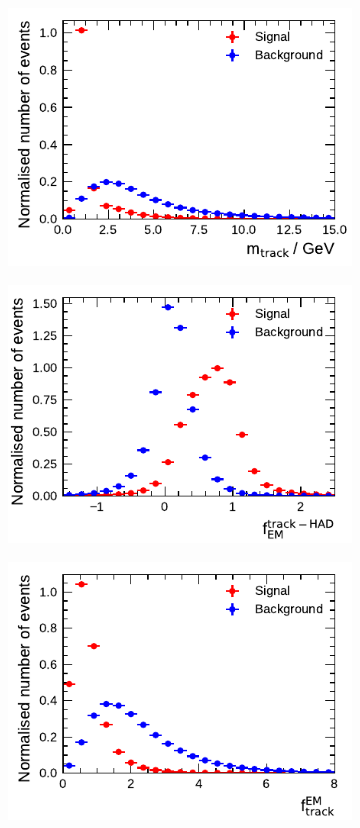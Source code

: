 \begin{figure}[htbp]\ContinuedFloat
  \begin{subfigure}{0.5\textwidth}
    \centering
    \includegraphics{./figures/baseline_bdt_vars/3p/massTrkSys.pdf}
  \end{subfigure}%
  \begin{subfigure}{0.5\textwidth}
    \centering
    \includegraphics{./figures/baseline_bdt_vars/3p/ChPiEMEOverCaloEME.pdf}
  \end{subfigure}
  \begin{subfigure}{0.5\textwidth}
    \centering
    \includegraphics{./figures/baseline_bdt_vars/3p/EMPOverTrkSysP.pdf}

\end{subfigure}
\end{figure}
